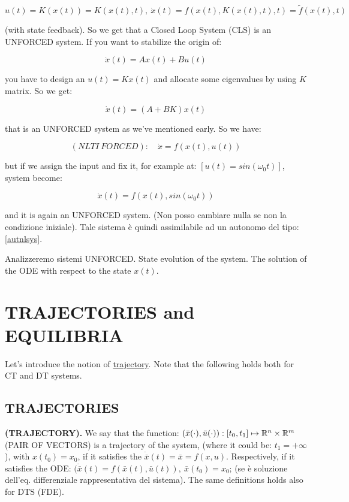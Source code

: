 \begin{equation}
\label{autnlsys}
	u(t) = K(x(t)) = K(x(t),t),\ \dot{x}(t) = f(x(t),K(x(t),t),t) = \tilde{f}(x(t),t)
\end{equation}

(with state feedback). So we get that a Closed Loop System (CLS) is an UNFORCED system. If you want to stabilize the origin of:

\[
	\dot{x}(t) = Ax(t) + Bu(t)
\]

you have to design an $u(t) = Kx(t)$ and allocate some eigenvalues by using $K$ matrix. So we get:

\[
	\dot{x}(t) = (A+BK)x(t)
\]

that is an UNFORCED system as we've mentioned early. So we have:

\[
	(NLTI\ FORCED):\quad \dot{x} = f(x(t),u(t))
\]

but if we assign the input and fix it, for example at: $[u(t) = sin(\omega_0t)]$, system become:

\[
	\dot{x}(t) = f(x(t), sin(\omega_0t))
\]

and it is again an UNFORCED system. (Non posso cambiare nulla se non la condizione iniziale). Tale sistema è quindi assimilabile ad un autonomo del tipo: \ref{autnlsys}.


Analizzeremo sistemi UNFORCED. State evolution of the system. The solution of the ODE with respect to the state $x(t)$.

\section{TRAJECTORIES and EQUILIBRIA}

Let's introduce the notion of \underline{trajectory}. Note that the following holds both for CT and DT systems.

\subsection{TRAJECTORIES}

\begin{defn}{\textbf{(TRAJECTORY).}}
We say that the function: $(\bar{x}(\mathord{\cdot}),\bar{u}(\mathord{\cdot})) : [t_0, t_1] \mapsto \mathbb{R}^n \times \mathbb{R}^m$ (PAIR OF VECTORS) is a trajectory of the system, (where it could be: $t_1 = +\infty$), with $x(t_0) = x_0$, if it satisfies the $\dot{\bar{x}}(t) = \bar{x} = f(x,u)$. Respectively, if it satisfies the ODE: $(\dot{\bar{x}}(t) = f(\bar{x}(t), \bar{u}(t)),\ \bar{x}(t_0) = x_0$; (se è soluzione dell'eq. differenziale rappresentativa del sistema). The same definitions holds also for DTS (FDE).
\end{defn}

